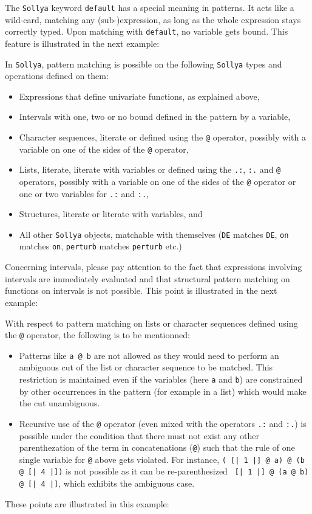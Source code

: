 \documentclass[a4paper]{article}
\newcommand{\key}[1]{\texttt{#1}}
\newcommand{\sollya}{\texttt{Sollya}\xspace}
\begin{document}


The \sollya keyword \key{default} has a special meaning in patterns.
It acts like a wild-card, matching any (sub-)expression, as long as
the whole expression stays correctly typed. Upon matching with
\key{default}, no variable gets bound. This feature is illustrated in
the next example:



In \sollya, pattern matching is possible on the following \sollya
types and operations defined on them:
\begin{itemize}
\item Expressions that define univariate functions, as explained above,
\item Intervals with one, two or no bound defined in the pattern by a variable,
\item Character sequences, literate or defined using the \key{@} operator, possibly with a variable on one of the sides of the \key{@} operator,
\item Lists, literate, literate with variables or defined using the \key{.:}, \key{:.} and \key{@} operators, possibly with a variable on one of the sides of the \key{@} operator or one or two variables for \key{.:} and \key{:.},
\item Structures, literate or literate with variables, and
\item All other \sollya objects, matchable with themselves (\key{DE} matches \key{DE}, \key{on} matches \key{on}, \key{perturb} matches \key{perturb} etc.)
\end{itemize}



Concerning intervals, please pay attention to the fact that expressions involving 
intervals are immediately evaluated and that structural pattern matching on functions
on intervals is not possible. This point is illustrated in the next example:



With respect to pattern matching on lists or character sequences
defined using the \key{@} operator, the following is to be mentionned:
\begin{itemize}
\item Patterns like \key{a @ b} are not allowed as they would need to
  perform an ambiguous cut of the list or character sequence to be
  matched. This restriction is maintained even if the variables (here
  \key{a} and \key{b}) are constrained by other occurrences in the
  pattern (for example in a list) which would make the cut
  unambiguous.
\item Recursive use of the \key{@} operator (even mixed with the
  operators \key{.:} and \key{:.}) is possible under the condition
  that there must not exist any other parenthezation of the term in
  concatenations (\key{@}) such that the rule of one single variable
  for \key{@} above gets violated. For instance, \key{( [| 1 |] @ a) @
    (b @ [| 4 |])} is not possible as it can be re-parenthesized \key{
    [| 1 |] @ (a @ b) @ [| 4 |]}, which exhibits the ambiguous case.
\end{itemize}
These points are illustrated in this example:
\end{document}
